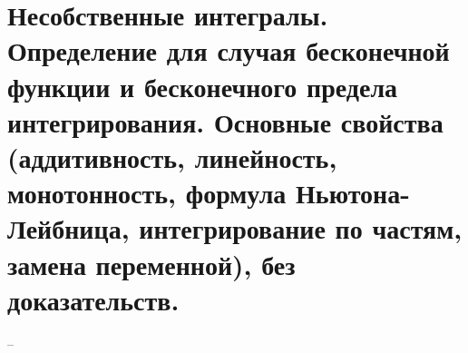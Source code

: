 \section{Несобственные интегралы. Определение для случая бесконечной функции и бесконечного предела интегрирования. Основные свойства (аддитивность, линейность, монотонность, формула Ньютона-Лейбница, интегрирование по частям, замена переменной), без доказательств.}
--
\newline